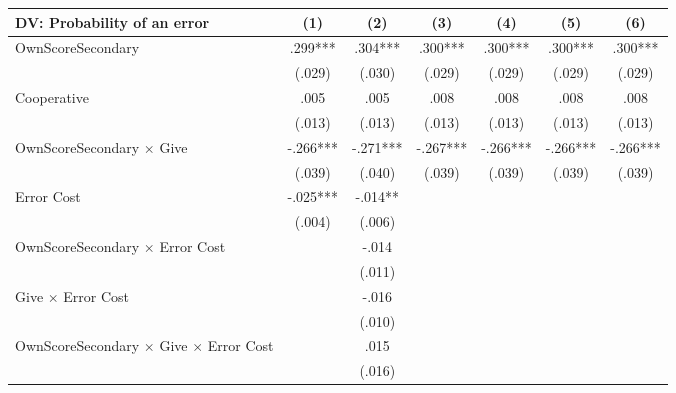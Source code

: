 \begingroup
\centering
\begin{tabular*}{\linewidth}{@{\extracolsep{\fill}}lcccccc}
   \toprule
   DV: Probability of an error & \multicolumn{1}{c}{(1)} & \multicolumn{1}{c}{(2)} & \multicolumn{1}{c}{(3)} & \multicolumn{1}{c}{(4)} & \multicolumn{1}{c}{(5)} & \multicolumn{1}{c}{(6)}\\
   \midrule
   OwnScoreSecondary & \mbox{\hphantom{8}.299***} & \mbox{\hphantom{8}.304***} & \mbox{\hphantom{8}.300***} & \mbox{\hphantom{8}.300***} & \mbox{\hphantom{8}.300***} & \mbox{\hphantom{8}.300***}\\
    & \mbox{(.029)\hphantom{88}} & \mbox{(.030)\hphantom{88}} & \mbox{(.029)\hphantom{88}} & \mbox{(.029)\hphantom{88}} & \mbox{(.029)\hphantom{88}} & \mbox{(.029)\hphantom{88}}\\
   Cooperative & \mbox{\hphantom{8}.005\hphantom{888}} & \mbox{\hphantom{8}.005\hphantom{888}} & \mbox{\hphantom{8}.008\hphantom{888}} & \mbox{\hphantom{8}.008\hphantom{888}} & \mbox{\hphantom{8}.008\hphantom{888}} & \mbox{\hphantom{8}.008\hphantom{888}}\\
    & \mbox{(.013)\hphantom{88}} & \mbox{(.013)\hphantom{88}} & \mbox{(.013)\hphantom{88}} & \mbox{(.013)\hphantom{88}} & \mbox{(.013)\hphantom{88}} & \mbox{(.013)\hphantom{88}}\\
   OwnScoreSecondary $\times$ Give & \mbox{-.266***} & \mbox{-.271***} & \mbox{-.267***} & \mbox{-.266***} & \mbox{-.266***} & \mbox{-.266***}\\
    & \mbox{(.039)\hphantom{88}} & \mbox{(.040)\hphantom{88}} & \mbox{(.039)\hphantom{88}} & \mbox{(.039)\hphantom{88}} & \mbox{(.039)\hphantom{88}} & \mbox{(.039)\hphantom{88}}\\
   Error Cost & \mbox{-.025***} & \mbox{-.014**\hphantom{8}} &  &  &  & \\
    & \mbox{(.004)\hphantom{88}} & \mbox{(.006)\hphantom{88}} &  &  &  & \\
   OwnScoreSecondary $\times$ Error Cost &  & \mbox{-.014\hphantom{888}} &  &  &  & \\
    &  & \mbox{(.011)\hphantom{88}} &  &  &  & \\
   Give $\times$ Error Cost &  & \mbox{-.016\hphantom{888}} &  &  &  & \\
    &  & \mbox{(.010)\hphantom{88}} &  &  &  & \\
   OwnScoreSecondary $\times$ Give $\times$ Error Cost &  & \mbox{\hphantom{8}.015\hphantom{888}} &  &  &  & \\
    &  & \mbox{(.016)\hphantom{88}} &  &  &  & \\

\end{tabular*}
